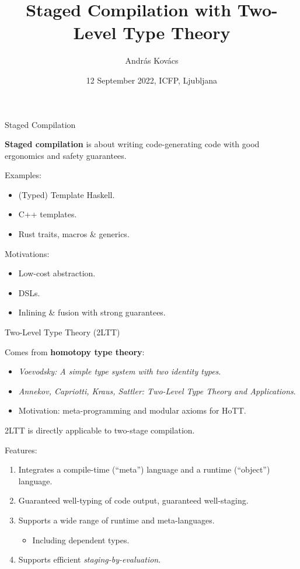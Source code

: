 \documentclass[dvipsnames,aspectratio=169]{beamer}
\title{Staged Compilation with Two-Level Type Theory}
\author{András Kovács}
\institute{
  {Eötvös Loránd University}
}
\date{12 September 2022, ICFP, Ljubljana}
\theoremstyle{remark}
\begin{document}
\frame{\titlepage}

\begin{frame}{Staged Compilation}

\begin{block}{}
\textbf{Staged compilation} is about writing code-generating code with good ergonomics
and safety guarantees.
\end{block}
\vspace{1em}
\pause

Examples:
\begin{itemize}
  \item (Typed) Template Haskell.
  \item C++ templates.
  \item Rust traits, macros \& generics.
\end{itemize}
\vspace{1em}
\pause

Motivations:
\begin{itemize}
  \item Low-cost abstraction.
  \item DSLs.
  \item Inlining \& fusion with strong guarantees.
\end{itemize}

\end{frame}

\begin{frame}{Two-Level Type Theory (2LTT)}

Comes from \textbf{homotopy type theory}:
\begin{itemize}
  \item \emph{Voevodsky: A simple type system with two identity types}.
  \item \emph{Annekov, Capriotti, Kraus, Sattler: Two-Level Type Theory and Applications}.
  \item Motivation: meta-programming and modular axioms for HoTT.
\end{itemize}
\vspace{1em}
\pause

2LTT is directly applicable to two-stage compilation.
\vspace{1em}
\pause

Features:
\begin{enumerate}
\item Integrates a compile-time (``meta'') language and a runtime (``object'') language.
\pause
\item Guaranteed well-typing of code output, guaranteed well-staging.
\pause
\item Supports a wide range of runtime and meta-languages.
  \begin{itemize}
  \pause
  \item \alert{Including dependent types}.
  \end{itemize}
\pause
\item Supports efficient \emph{staging-by-evaluation}.
\end{enumerate}
\vspace{1em}
\end{frame}
\end{document}
